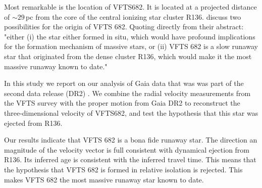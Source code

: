 \documentclass{aa}
\begin{document}
{Most remarkable is the location of  VFTS682.  It is located at a projected distance of $\sim$$29$\,pc from the core of the central ionizing star cluster R136.   \citet{bestenlehner:11} discuss two possibilities for the  origin of VFTS 682. Quoting directly from their abstract:  "either (i) the star either formed in situ, which would have profound implications for the formation mechanism of massive stars, or (ii) VFTS 682 is a slow runaway star that originated from the dense cluster R136, which would make it the most massive runaway known to date."  

In this study we report on our analysis of Gaia data that was was part of the second data release (DR2) \cite[][]{gaia:16,brown:18}.  We combine the radial velocity measurements from the VFTS survey \citep[][]{evans:11} with the proper motion from Gaia DR2 to reconstruct the three-dimensional velocity of VFTS682, and test the hypothesis that this star was ejected from R136. 

Our results indicate that VFTS 682 is a bona fide runaway star.  The direction an magnitude of the velocity vector is full consistent with dynamical ejection from R136.  Its inferred age is consistent with the inferred travel time. This means that the hypothesis that VFTS 682 is formed in relative isolation is rejected.  This makes  VFTS 682 the most massive runaway star known to date. 

}
\end{document}
